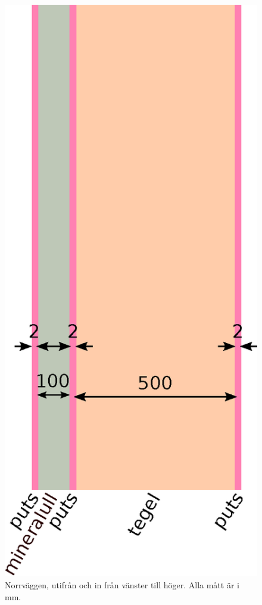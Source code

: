 \begin{figure}[hpbt]
\centering
\includegraphics[height=0.4\textheight]{images/norrvagg.eps}
\caption{\label{fig:norrvagg}{Norrväggen, utifrån och in från vänster till höger. Alla mått är i mm.}}
\end{figure}

